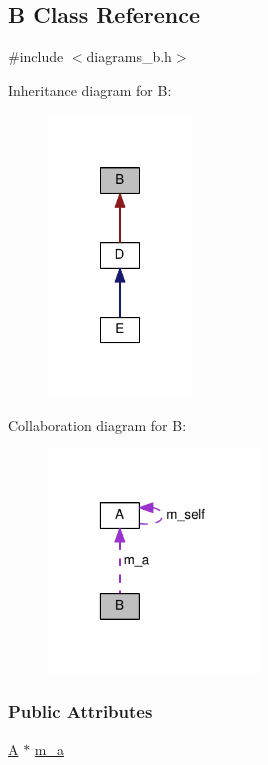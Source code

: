 \hypertarget{class_b}{}\subsection{B Class Reference}
\label{class_b}


{\ttfamily \#include $<$diagrams\+\_\+b.\+h$>$}



Inheritance diagram for B\+:
\nopagebreak
\begin{figure}[H]
\begin{center}
\leavevmode
\includegraphics[width=108pt]{class_b__inherit__graph}
\end{center}
\end{figure}


Collaboration diagram for B\+:
\nopagebreak
\begin{figure}[H]
\begin{center}
\leavevmode
\includegraphics[width=159pt]{class_b__coll__graph}
\end{center}
\end{figure}
\subsubsection*{Public Attributes}
\begin{DoxyCompactItemize}
\item 
\hyperlink{class_a}{A} $\ast$ \hyperlink{class_b_a26c70b64fe7cf17fcced7755ecff7537}{m\+\_\+a}
\end{DoxyCompactItemize}


